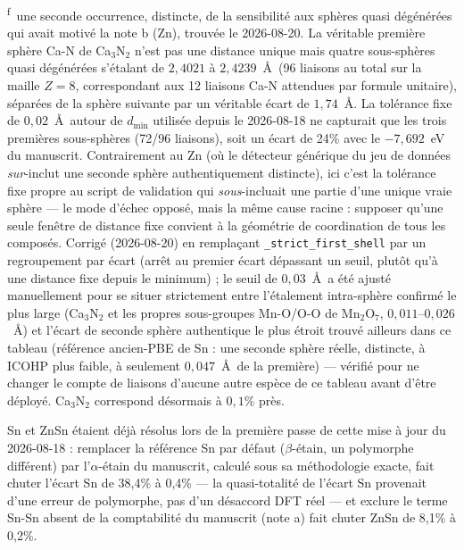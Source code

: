 \noindent\textsuperscript{f}~une seconde occurrence, distincte, de la sensibilité aux sphères quasi dégénérées qui avait motivé la note b (Zn), trouvée le 2026-08-20. La véritable première sphère Ca-N de Ca$_3$N$_2$ n'est pas une distance unique mais quatre sous-sphères quasi dégénérées s'étalant de $2{,}4021$ à $2{,}4239$~\AA\ (96 liaisons au total sur la maille $Z=8$, correspondant aux 12 liaisons Ca-N attendues par formule unitaire), séparées de la sphère suivante par un véritable écart de $1{,}74$~\AA. La tolérance fixe de $0{,}02$~\AA\ autour de $d_{\min}$ utilisée depuis le 2026-08-18 ne capturait que les trois premières sous-sphères (72/96 liaisons), soit un écart de 24\% avec le $-7{,}692$~eV du manuscrit. Contrairement au Zn (où le détecteur générique du jeu de données \emph{sur}-inclut une seconde sphère authentiquement distincte), ici c'est la tolérance fixe propre au script de validation qui \emph{sous}-incluait une partie d'une unique vraie sphère --- le mode d'échec opposé, mais la même cause racine : supposer qu'une seule fenêtre de distance fixe convient à la géométrie de coordination de tous les composés. Corrigé (2026-08-20) en remplaçant \texttt{\_strict\_first\_shell} par un regroupement par écart (arrêt au premier écart dépassant un seuil, plutôt qu'à une distance fixe depuis le minimum) ; le seuil de $0{,}03$~\AA\ a été ajusté manuellement pour se situer strictement entre l'étalement intra-sphère confirmé le plus large (Ca$_3$N$_2$ et les propres sous-groupes Mn-O/O-O de Mn$_2$O$_7$, $0{,}011$--$0{,}026$~\AA) et l'écart de seconde sphère authentique le plus étroit trouvé ailleurs dans ce tableau (référence ancien-PBE de Sn : une seconde sphère réelle, distincte, à ICOHP plus faible, à seulement $0{,}047$~\AA\ de la première) --- vérifié pour ne changer le compte de liaisons d'aucune autre espèce de ce tableau avant d'être déployé. Ca$_3$N$_2$ correspond désormais à $0{,}1\%$ près.

Sn et ZnSn étaient déjà résolus lors de la première passe de cette
mise à jour du 2026-08-18 : remplacer la référence Sn par défaut
($\beta$-étain, un polymorphe différent) par l'$\alpha$-étain du
manuscrit, calculé sous sa méthodologie exacte, fait chuter l'écart Sn
de 38,4\% à 0,4\% --- la quasi-totalité de l'écart Sn provenait d'une
erreur de polymorphe, pas d'un désaccord DFT réel --- et exclure le
terme Sn-Sn absent de la comptabilité du manuscrit (note a) fait
chuter ZnSn de 8,1\% à 0,2\%.

